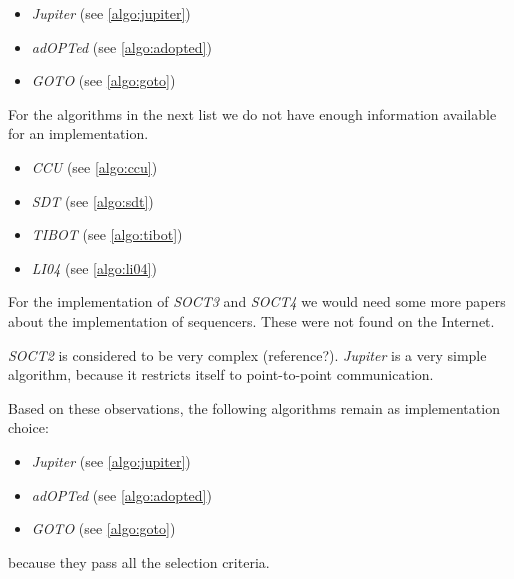 \begin{itemize}
 \item \emph{Jupiter} (see \ref{algo:jupiter}) 
 \item \emph{adOPTed} (see \ref{algo:adopted})
 \item \emph{GOTO} (see \ref{algo:goto})
\end{itemize}

For the algorithms in the next list we do not have enough information available for an implementation.

\begin{itemize}
 \item \emph{CCU} (see \ref{algo:ccu})
 \item \emph{SDT} (see \ref{algo:sdt})
 \item \emph{TIBOT} (see \ref{algo:tibot})
 \item \emph{LI04} (see \ref{algo:li04})
\end{itemize}

For the implementation of \emph{SOCT3} and \emph{SOCT4} we would need some more papers about the implementation of sequencers. These were not found on the Internet.

\emph{SOCT2} is considered to be very complex (reference?). \emph{Jupiter} is a very simple algorithm, because it restricts itself to point-to-point communication. 

Based on these observations, the following algorithms remain as implementation choice:

\begin{itemize}
 \item \emph{Jupiter} (see \ref{algo:jupiter})
 \item \emph{adOPTed} (see \ref{algo:adopted})
 \item \emph{GOTO} (see \ref{algo:goto})
\end{itemize}

because they pass all the selection criteria.

